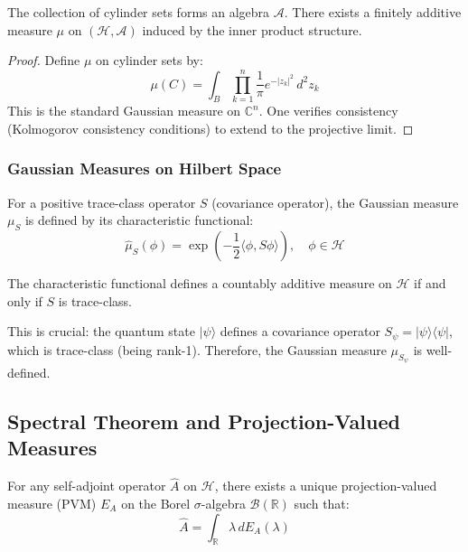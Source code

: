 \begin{theorem}
The collection of cylinder sets forms an algebra $\mathcal{A}$. There exists a finitely additive measure $\mu$ on $(\mathcal{H}, \mathcal{A})$ induced by the inner product structure.
\end{theorem}

\begin{proof}
Define $\mu$ on cylinder sets by:
\begin{equation}
    \mu(C) = \int_B \prod_{k=1}^n \frac{1}{\pi} e^{-|z_k|^2} \, d^2z_k
\end{equation}
This is the standard Gaussian measure on $\mathbb{C}^n$. One verifies consistency (Kolmogorov consistency conditions) to extend to the projective limit.
\end{proof}

\subsubsection{Gaussian Measures on Hilbert Space}

\begin{definition}
For a positive trace-class operator $S$ (covariance operator), the Gaussian measure $\mu_S$ is defined by its characteristic functional:
\begin{equation}
    \hat{\mu}_S(\phi) = \exp\left(-\frac{1}{2}\langle \phi, S\phi \rangle\right), \quad \phi \in \mathcal{H}
\end{equation}
\end{definition}

\begin{theorem}
The characteristic functional defines a countably additive measure on $\mathcal{H}$ if and only if $S$ is trace-class.
\end{theorem}

This is crucial: the quantum state $|\psi\rangle$ defines a covariance operator $S_\psi = |\psi\rangle\langle\psi|$, which is trace-class (being rank-1). Therefore, the Gaussian measure $\mu_{S_\psi}$ is well-defined.

\subsection{Spectral Theorem and Projection-Valued Measures}

\begin{theorem}
For any self-adjoint operator $\hat{A}$ on $\mathcal{H}$, there exists a unique projection-valued measure (PVM) $E_A$ on the Borel $\sigma$-algebra $\mathcal{B}(\mathbb{R})$ such that:
\begin{equation}
    \hat{A} = \int_{\mathbb{R}} \lambda \, dE_A(\lambda)
\end{equation}
\end{theorem}

